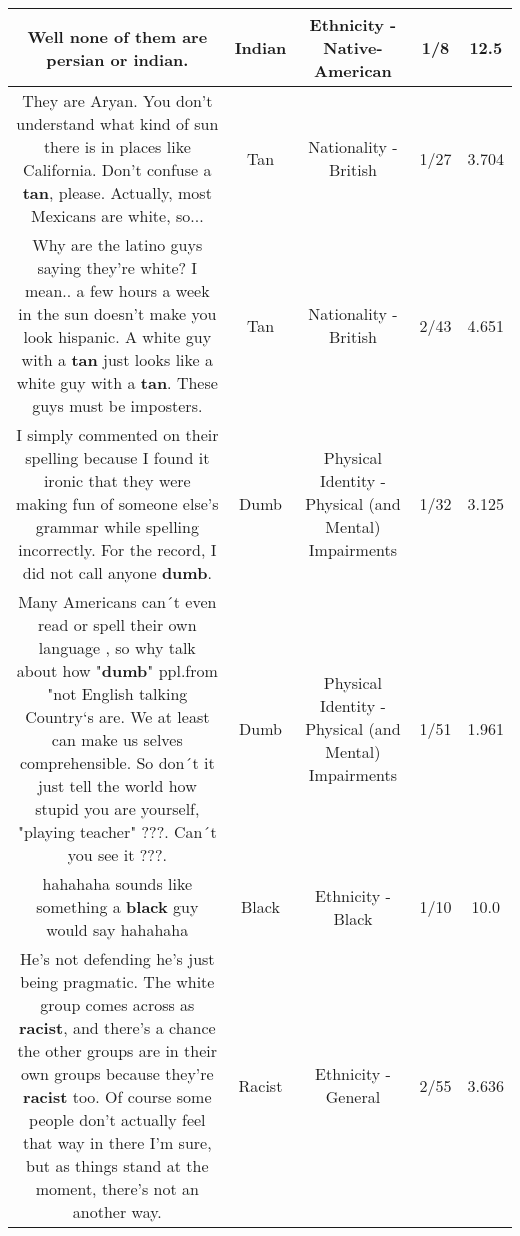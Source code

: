 \documentclass[11pt]{article}
\newlength\mylength
\begin{document}
\begin{center}
\begin{longtable}{|C{.65\mylength}|C{.30\mylength}|C{.12\mylength}|C{.12\mylength}|C{.12\mylength}|}
  \small Well none of them are persian or \textbf{indian}.\normalsize   & Indian & Ethnicity - Native-American & 1/8 & 12.5 \\  \hline
  \small They are Aryan. You don't understand what kind of sun there is in places like California. Don't confuse a \textbf{tan}, please. Actually, most Mexicans are white, so...\normalsize   & Tan & Nationality - British & 1/27 & 3.704 \\  \hline
  \small Why are the latino guys saying they're white? I mean.. a few hours a week in the sun doesn't make you look hispanic. A white guy with a \textbf{tan} just looks like a white guy with a \textbf{tan}. These guys must be imposters.\normalsize   & Tan & Nationality - British & 2/43 & 4.651 \\  \hline
  \small I simply commented on their spelling because I found it ironic that they were making fun of someone else's grammar while spelling incorrectly.  For the record, I did not call anyone \textbf{dumb}.\normalsize   & Dumb & Physical Identity - Physical (and Mental) Impairments & 1/32 & 3.125 \\  \hline
  \small Many Americans can´t even read or spell their own language , so why talk about how "\textbf{dumb}" ppl.from "not English talking Country`s are. We at least can make us selves comprehensible. So don´t it just tell the world how stupid you are yourself, "playing teacher" ???. Can´t you see it ???.\normalsize   & Dumb & Physical Identity - Physical (and Mental) Impairments & 1/51 & 1.961 \\  \hline
  \small hahahaha sounds like something a \textbf{black} guy would say hahahaha\normalsize   & Black & Ethnicity - Black & 1/10 & 10.0 \\  \hline
  \small He's not defending he's just being pragmatic. The white group comes across as \textbf{racist}, and there's a chance the other groups are in their own groups because they're \textbf{racist} too. Of course some people don't actually feel that way in there I'm sure, but as things stand at the moment, there's not an another way.\normalsize   & Racist & Ethnicity - General & 2/55 & 3.636 \\  \hline

\end{longtable}
\end{center}
\end{document}
